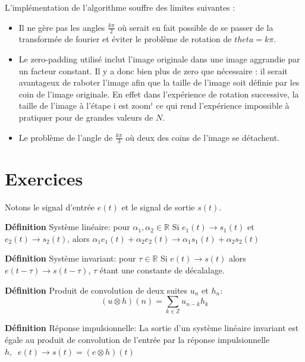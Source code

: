 L'implémentation de l'algorithme souffre des limites suivantes : 
\begin{itemize}

\item Il ne gère pas les angles $\frac{k\pi}{2}$ où serait en fait possible de se passer de la transformée de fourier et éviter le problème de rotation de $theta =  k\pi$.
\item Le zero-padding utilisé  inclut l'image originale dans une image aggrandie par un facteur constant. Il y a donc bien plus de zero que nécessaire : il serait avantageux de raboter l'image afin que la taille de l'image soit définie par les coin de l'image originale. En effet dans l'expérience de rotation successive, la taille de l'image à l'étape i est zoom$^i$ ce qui rend l'expérience impossible à pratiquer pour de grandes valeurs de $N$.
\item Le problème de l'angle de $\frac{k\pi}{3}$ où deux des coins de l'image se détachent.

\end{itemize}

\section{Exercices}

Notons le signal d'entrée $e(t)$ et le signal de sortie $s(t)$.


\textbf{Définition} Système linéaire: pour $\alpha_1, \alpha_2 \in \mathbb{R}$\newline
Si $e_1(t) \rightarrow s_1(t)$ et $e_2(t) \rightarrow s_2(t)$, alors $\alpha_1 e_1(t) + \alpha_2 e_2(t) \rightarrow \alpha_1 s_1(t) + \alpha_2 s_2(t)$

\textbf{Définition} Système invariant: pour $\tau \in \mathbb{R}$ \newline
Si $e(t) \rightarrow s(t)$ alors $e(t-\tau) \rightarrow s(t-\tau)$, $\tau$ étant une constante de décalalage.

\textbf{Définition} Produit de convolution de deux suites $u_n$ et $h_n$: \newline
$$ (u \otimes h)(n) = \sum_{k \in \mathbb{Z}} u_{n-k}h_k $$

\textbf{Définition} Réponse impulsionnelle: \newline
La sortie d'un système linéaire invariant est égale au produit de convolution de l'entrée par la réponse impulsionnelle $h, \;\;e(t) \longrightarrow s(t) = (e \otimes h)(t)$


